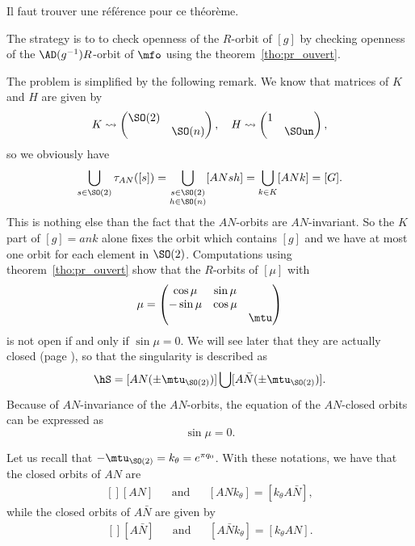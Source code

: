 \begin{probleme}
	Il faut trouver une référence pour ce théorème.
\end{probleme}

The strategy is to to check openness of the $R$-orbit of $[g]$ by checking openness of the $\AD(g^{-1})R$-orbit of $\mfo$ using the theorem~\ref{tho:pr_ouvert}.

The problem is simplified by the following remark.  We know that matrices of $K$ and $H$ are given by
\begin{equation}	\label{eq:K_H_SO}
	K\leadsto \begin{pmatrix}
		\SO(2) &        \\
		       & \SO(n)
	\end{pmatrix},\quad
	H\leadsto \begin{pmatrix}
		1 &       \\
		  & \SOun
	\end{pmatrix},
\end{equation}
so we obviously have
\[
	\bigcup_{s\in \SO(2)} \tau_{AN}([s]) =\bigcup_{\substack { s\in \SO(2)\\ h\in \SO(n)}}[ANsh] =\bigcup_{k\in K} [ANk] =[G].
\]
This is nothing else than the fact that the $AN$-orbits are $AN$-invariant.
So the $K$ part of $[g]=ank$ alone fixes the orbit which contains $[g]$ and we have at most one orbit for each element in $\SO(2)$. Computations using theorem~\ref{tho:pr_ouvert} show that the $R$-orbits of $[\mu]$ with
\[
	\mu=
	\begin{pmatrix}
		\cos\mu  & \sin\mu        \\
		-\sin\mu & \cos\mu        \\
		         &         & \mtu
	\end{pmatrix}
\]
is not open if and only if $\sin \mu=0$. We will see later that they are actually closed (page \pageref{PgTopoOrb}), so that the singularity is described as
\begin{equation}\label{Sing2}
	\hS=[AN(\pm\mtu_{\SO(2)})]\bigcup[A \bar{N}(\pm\mtu_{\SO(2)})].
\end{equation}
Because of $AN$-invariance of the $AN$-orbits, the equation of the $AN$-closed orbits can be expressed as
\begin{equation}
	\sin \mu=0.
\end{equation}

Let us recall that $-\mtu_{\SO(2)}=k_{\theta}= e^{\pi q_0}$. With these notations, we have that the closed orbits of $AN$ are
\begin{equation}
	\begin{aligned}[]
		[AN] &  & \text{and} &  & [ANk_{\theta}]=[k_{\theta}A\bar N],
	\end{aligned}
\end{equation}
while the closed orbits of $A\bar N$ are given by
\begin{equation}
	\begin{aligned}[]
		[A\bar N] &  & \text{and} &  & [A\bar Nk_{\theta}]=[k_{\theta}AN].
	\end{aligned}
\end{equation}

